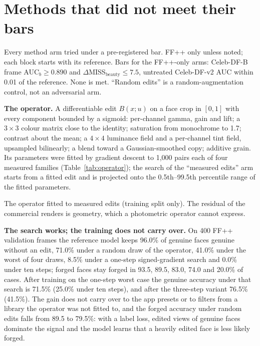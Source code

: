 \documentclass[10pt]{article}
\begin{document}
\section{Methods that did not meet their bars}
\label{sec:negative}
\begin{table}[H]
\centering
\caption{Every method arm tried under a pre-registered bar. FF++ only unless noted; each block starts with its reference. Bars for
the FF++-only arms: Celeb-DF-B frame AUC$_b\ge 0.890$ and $\Delta$MISS$_\text{beauty}\le 7.5$, untreated Celeb-DF-v2 AUC within 0.01
of the reference. None is met. ``Random edits'' is a random-augmentation control, not an adversarial arm.}
\label{tab:negative}
\footnotesize
\begin{adjustbox}{max width=\linewidth}\end{adjustbox}
\end{table}
\textbf{The operator.} A differentiable edit $B(x;u)$ on a face crop in $[0,1]$ with every component bounded by a sigmoid:
per-channel gamma, gain and lift; a $3\times3$ colour matrix close to the identity; saturation from monochrome to 1.7; contrast about
the mean; a $4\times4$ luminance field and a per-channel tint field, upsampled bilinearly; a blend toward a Gaussian-smoothed copy;
additive grain. Its parameters were fitted by gradient descent to 1,000 pairs each of four measured families (Table~\ref{tab:operator});
the search of the ``measured edits'' arm starts from a fitted edit and is projected onto the 0.5th--99.5th percentile range of the
fitted parameters.
\begin{table}[H]
\centering
\caption{The operator fitted to measured edits (training split only). The residual of the commercial renders is geometry, which a
photometric operator cannot express.}
\label{tab:operator}
\footnotesize

\end{table}
\textbf{The search works; the training does not carry over.} On 400 FF++ validation frames the reference model keeps 96.0\% of
genuine faces genuine without an edit, 71.0\% under a random draw of the operator, 41.0\% under the worst of four draws, 8.5\% under
a one-step signed-gradient search and 0.0\% under ten steps; forged faces stay forged in 93.5, 89.5, 83.0, 74.0 and 20.0\% of cases.
After training on the one-step worst case the genuine accuracy under that search is 71.5\% (25.0\% under ten steps), and after the
three-step variant 76.5\% (41.5\%). The gain does not carry over to the app presets or to filters from a library the operator was
not fitted to, and the forged accuracy under random edits falls from 89.5 to 79.5\%: with a label loss, edited views of genuine faces
dominate the signal and the model learns that a heavily edited face is less likely forged.
\end{document}
